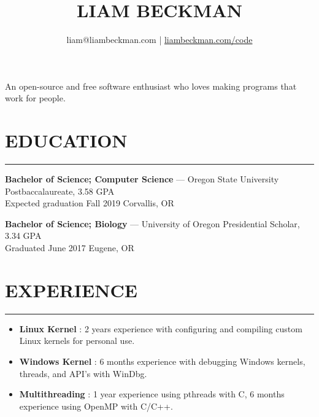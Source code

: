 


\title{\textcolor{my-red}{LIAM BECKMAN}}
\author{liam@liambeckman.com | \href{https://liambeckman.com/code}{liambeckman.com/code}}

\date{\vspace{-5ex}}



\maketitle

\begin{center}
An open-source and free software enthusiast who loves making programs that work for people.
\end{center}

\newcommand{\myTitle}[1] {
    \vspace{-1.5em}
    \section*{\large{#1}}\vspace{-1.7em}
    \textcolor{my-grey}{\rule{\linewidth}{0.5pt}}
    \vspace{-1em}
}

\newcommand{\showoff}[4] {
    \textcolor{my-blue}{\textbf{#1}} --- #2\\
    \textcolor{my-grey}{#3 \hfill #4}
    \medskip
}

\newcommand{\myBreak} {
    \textcolor{my-grey}{\dotfill}
    \smallskip
}

\newcommand{\myItem}[1] {
    \item\textcolor{my-blue}{\textbf{#1}}
}

\myTitle{EDUCATION}

\showoff{Bachelor of Science; Computer Science}{Oregon State University Postbaccalaureate, 3.58 GPA}{Expected graduation Fall 2019}{Corvallis, OR}

\myBreak

\showoff{Bachelor of Science; Biology}{University of Oregon Presidential Scholar, 3.34 GPA}{Graduated June 2017}{Eugene, OR}

\medbreak

\myTitle{EXPERIENCE}

\vspace{-1em}
\begin{itemize}[label=\triangleright]
    \myItem{Linux Kernel}: 2 years experience with configuring and compiling custom Linux kernels for personal use.
    \myItem{Windows Kernel}: 6 months experience with debugging Windows kernels, threads, and API's with WinDbg.
    \myItem{Multithreading}: 1 year experience using pthreads with C, 6 months experience using OpenMP with C/C++.
\end{itemize}

